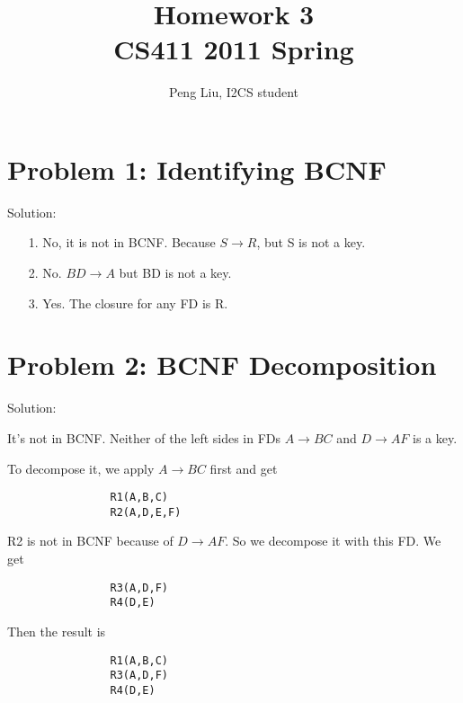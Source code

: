 \documentclass[letter,11pt]{article}
\author{Peng Liu, I2CS student}
\title{Homework 3\\CS411 2011 Spring}
\begin{document}
\lstset{language=SQL}
\maketitle

\section*{Problem 1: Identifying BCNF} Solution:
\begin{enumerate}
\item[1.] No, it is not in BCNF. Because $S\rightarrow R$, but S is not a key.

\item[2.] No. $BD\rightarrow A$ but BD is not a key.

\item[3.] Yes. The closure for any FD is R. 

\end{enumerate}

\section*{Problem 2: BCNF Decomposition} Solution:

It's not in BCNF. Neither of the left sides in FDs $A\rightarrow BC$ and $D\rightarrow AF$ is a key.

To decompose it, we apply $A\rightarrow BC$ first and get
\begin{verbatim}
                R1(A,B,C)
                R2(A,D,E,F)
\end{verbatim}

R2 is not in BCNF because of $D\rightarrow AF$. So we decompose it with this FD. We get 
\begin{verbatim}
                R3(A,D,F)
                R4(D,E)
\end{verbatim}

Then the result is
\begin{verbatim}
                R1(A,B,C)
                R3(A,D,F)
                R4(D,E)
\end{verbatim}
\end{document}
